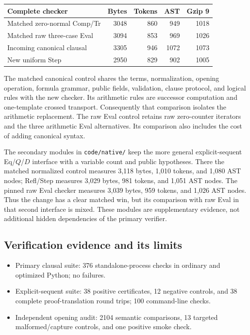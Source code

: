 \documentclass[11pt,letterpaper]{article}
\theoremstyle{definition}
\begin{document}
\begin{center}
\small
\begin{tabular}{lrrrr}
\toprule
Complete checker & Bytes & Tokens & AST & Gzip 9\\
\midrule
Matched zero-normal Comp/Tr & 3048 & 860 & 949 & 1018\\
Matched raw three-case Eval & 3094 & 853 & 969 & 1026\\
Incoming canonical clausal & 3305 & 946 & 1072 & 1073\\
New uniform Step & 2950 & 829 & 902 & 1005\\
\bottomrule
\end{tabular}
\end{center}

The matched canonical control shares the terms, normalization,
opening operation, formula grammar, public fields, validation, clause
protocol, and logical rules with the new checker. Its arithmetic rules
are successor computation and one-template crossed transport.
Consequently that comparison isolates the arithmetic replacement.
The raw Eval control retains raw zero-counter iterators and the three
arithmetic Eval alternatives. Its comparison also includes the cost
of adding canonical syntax.

The secondary modules in \texttt{code/native/} keep the more general
explicit-sequent Eq/\(Q\)/\(D\) interface with a variable count and
public hypotheses. There the matched normalized control measures
3,118 bytes, 1,010 tokens, and 1,080 AST nodes; Refl/Step measures
3,029 bytes, 981 tokens, and 1,051 AST nodes. The pinned raw Eval
checker measures 3,039 bytes, 959 tokens, and 1,026 AST nodes.
Thus the change has a clear matched win, but its comparison with
raw Eval in that second interface is mixed. These modules are
supplementary evidence, not additional hidden dependencies of
the primary verifier.

\subsection{Verification evidence and its limits}

\begin{itemize}
\item Primary clausal suite: 376 standalone-process checks in ordinary and optimized Python; no failures.
\item Explicit-sequent suite: 38 positive certificates, 12 negative controls, and 38 complete proof-translation round trips; 100 command-line checks.
\item Independent opening audit: 2104 semantic comparisons, 13 targeted malformed/capture controls, and one positive smoke check.
\end{itemize}
\end{document}
